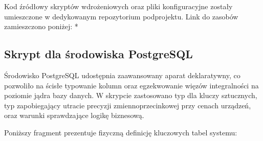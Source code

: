 \documentclass[letterpaper,10pt,polish]{sphinxmanual}
\begin{document}
\sphinxAtStartPar
Kod źródłowy skryptów wdrożeniowych oraz pliki konfiguracyjne zostały umieszczone w dedykowanym repozytorium podprojektu. Link do zasobów zamieszczono poniżej:
*  


\subsection{Skrypt dla środowiska PostgreSQL}
\label{\detokenize{rozdzia_u0142_4/BD_WprowadzanieBD/index:skrypt-dla-srodowiska-postgresql}}
\sphinxAtStartPar
Środowisko PostgreSQL udostępnia zaawansowany aparat deklaratywny, co pozwoliło na ścisłe typowanie kolumn oraz egzekwowanie więzów integralności na poziomie jądra bazy danych. W skrypcie zastosowano typ  dla kluczy sztucznych, typ  zapobiegający utracie precyzji zmiennoprzecinkowej przy cenach urządzeń, oraz warunki  sprawdzające logikę biznesową.

\sphinxAtStartPar
Poniższy fragment prezentuje fizyczną definicję kluczowych tabel systemu:
\end{document}

